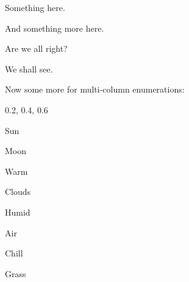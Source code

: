 \documentclass{article}
\begin{document}
	\begin{hEnumerateArabic}
		\item
		\begin{hEnumerateAlpha}
			\item Something here.
			\item And something more here.
		\end{hEnumerateAlpha}

		\item
		\begin{hEnumerateRoman}
			\item Are we all right?
			\item We shall see.
		\end{hEnumerateRoman}
	\end{hEnumerateArabic}

	Now some more for multi-column enumerations:

	\begin{hEnumerateAlphaMulticolumn*}{0.2\textwidth, 0.4\textwidth, 0.6\textwidth}
		\item Sun
		\item Moon
		\item Warm
		\item Clouds
		\item Humid
		\item Air
		\item Chill
		\item Grass
	\end{hEnumerateAlphaMulticolumn*}
\end{document}
